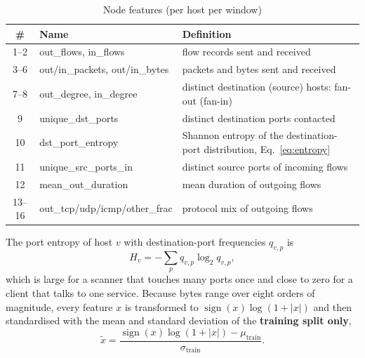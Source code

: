 \begin{table}[htbp]
\centering
\caption{Node features (per host per window)}
\label{tab:nodefeat}
\small
\begin{tabularx}{\textwidth}{|c|l|X|}
\hline
\textbf{\#} & \textbf{Name} & \textbf{Definition} \\ \hline
1--2 & out\_flows, in\_flows & flow records sent and received \\ \hline
3--6 & out/in\_packets, out/in\_bytes & packets and bytes sent and received \\ \hline
7--8 & out\_degree, in\_degree & distinct destination (source) hosts: fan-out (fan-in) \\ \hline
9 & unique\_dst\_ports & distinct destination ports contacted \\ \hline
10 & dst\_port\_entropy & Shannon entropy of the destination-port distribution, Eq.~\ref{eq:entropy} \\ \hline
11 & unique\_src\_ports\_in & distinct source ports of incoming flows \\ \hline
12 & mean\_out\_duration & mean duration of outgoing flows \\ \hline
13--16 & out\_tcp/udp/icmp/other\_frac & protocol mix of outgoing flows \\ \hline
\end{tabularx}
\end{table}

The port entropy of host $v$ with destination-port frequencies $q_{v,p}$ is
\begin{equation}
H_v=-\sum_{p} q_{v,p}\log_2 q_{v,p},
\label{eq:entropy}
\end{equation}
which is large for a scanner that touches many ports once and close to zero for a client that talks to one service. Because bytes range over eight orders of magnitude, every feature $x$ is transformed to $\operatorname{sign}(x)\log(1+|x|)$ and then standardised with the mean and standard deviation of the \textbf{training split only},
\begin{equation}
\tilde{x}=\frac{\operatorname{sign}(x)\log(1+|x|)-\mu_{\text{train}}}{\sigma_{\text{train}}}.
\label{eq:norm}
\end{equation}

